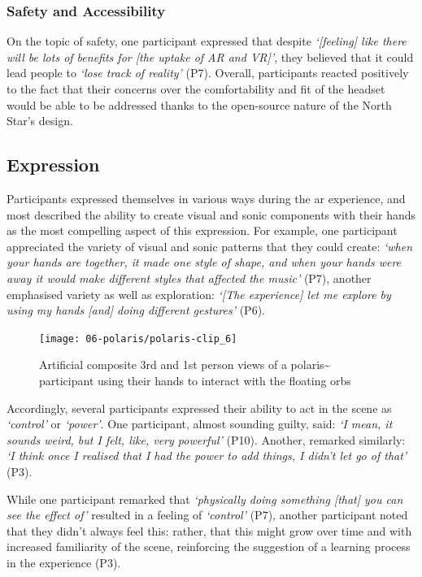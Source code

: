 \subsubsection{Safety and Accessibility}\label{sec: polaris-feedback-adoption-safety}
On the topic of safety, one participant expressed that despite \textit{`[feeling] like there will be lots of benefits for [the uptake of AR and VR]'}, they believed that it could lead people to \textit{`lose track of reality'} (P7). Overall, participants reacted positively to the fact that their concerns over the comfortability and fit of the headset would be able to be addressed thanks to the open-source nature of the North Star's design.

\subsection{Expression}\label{sec: polaris-feedback-expression}
Participants expressed themselves in various ways during the \ac{ar} experience, and most described the ability to create visual and sonic components with their hands as the most compelling aspect of this expression. For example, one participant appreciated the variety of visual and sonic patterns that they could create: \textit{`when your hands are together, it made one style of shape, and when your hands were away it would make different styles that affected the music'} (P7), another emphasised variety as well as exploration: \textit{`[The experience] let me explore by using my hands [and] doing different gestures'} (P6).

\begin{figure}[ht]
    \centering
    \texttt{[image: 06-polaris/polaris-clip\_6]}
    \captionsetup{justification=centering,margin=1.5cm}
    \caption{Artificial composite 3rd and 1st person views of a polaris\textasciitilde{} participant using their hands to interact with the floating orbs \citep[from][\href{https://youtu.be/T7CAjPk2Zs0}{at 0:00}]{bilbow2022}}\label{fig: polaris-clip_6}
\end{figure}

Accordingly, several participants expressed their ability to act in the scene as \textit{`control'} or \textit{`power'}. One participant, almost sounding guilty, said: \textit{`I mean, it sounds weird, but I felt, like, very powerful'} (P10). Another, remarked similarly: \textit{`I think once I realised that I had the power to add things, I didn't let go of that'} (P3).

While one participant remarked that \textit{`physically doing something [that] you can see the effect of'} resulted in a feeling of \textit{`control'} (P7), another participant noted that they didn't always feel this: rather, that this might grow over time and with increased familiarity of the scene, reinforcing the suggestion of a learning process in the experience (P3).

